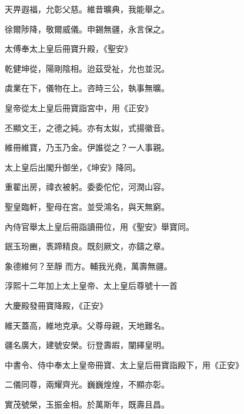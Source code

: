 \begin{pinyinscope}
 天畀遐福，允彰父慈。維昔曠典，我能舉之。



 徐爾陟降，敬爾威儀。申錫無疆，永言保之。



 太傅奉太上皇后冊寶升殿，《聖安》



 乾健坤從，陽剛陰相。迨茲受祉，允也並況。



 虡業在下，儀物在上。咨時三公，執事無曠。



 皇帝從太上皇后冊寶詣宮中，用《正安》



 丕顯文王，之德之純。亦有太姒，式揚徽音。



 維冊維寶，乃玉乃金。伊誰從之？一人事親。



 太上皇后出閣升御坐，《坤安》降同。



 重翟出房，禕衣被躬。委委佗佗，河潤山容。



 聖皇臨軒，聖母在宮。並受鴻名，與天無窮。



 內侍官舉太上皇后冊詣讀冊位，用《聖安》舉寶同。



 鈱玉玢豳，褭蹄精良。既刻厥文，亦鑄之章。



 象德維何？至靜
 而方。輔我光堯，萬壽無疆。



 淳熙十二年加上太上皇帝、太上皇后尊號十一首



 大慶殿發冊寶降殿，《正安》



 維天蓋高，維地克承。父尊母親，天地難名。



 疆名廣大，建號安榮。衍登壽嘏，闡繹皇明。



 中書令、侍中奉太上皇帝冊寶、太上皇后冊寶詣殿下，用《正安》



 二儀同尊，兩耀齊光。巍巍煌煌，不顯亦彰。



 實茂號榮，玉振金相。於萬斯年，既壽且昌。




\end{pinyinscope}
